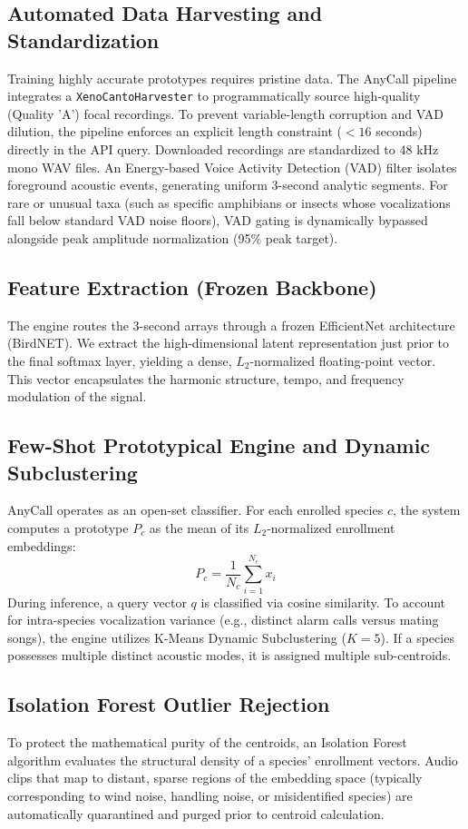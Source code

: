 \documentclass[11pt]{article}
\begin{document}
\subsection{Automated Data Harvesting and Standardization}
Training highly accurate prototypes requires pristine data. The AnyCall pipeline integrates a \texttt{XenoCantoHarvester} to programmatically source high-quality (Quality 'A') focal recordings. To prevent variable-length corruption and VAD dilution, the pipeline enforces an explicit length constraint ($<16$ seconds) directly in the API query. 
Downloaded recordings are standardized to $48\text{ kHz}$ mono WAV files. An Energy-based Voice Activity Detection (VAD) filter isolates foreground acoustic events, generating uniform 3-second analytic segments. For rare or unusual taxa (such as specific amphibians or insects whose vocalizations fall below standard VAD noise floors), VAD gating is dynamically bypassed alongside peak amplitude normalization (95\% peak target).

\subsection{Feature Extraction (Frozen Backbone)}
The engine routes the 3-second arrays through a frozen EfficientNet architecture (BirdNET). We extract the high-dimensional latent representation just prior to the final softmax layer, yielding a dense, $L_2$-normalized floating-point vector. This vector encapsulates the harmonic structure, tempo, and frequency modulation of the signal.

\subsection{Few-Shot Prototypical Engine and Dynamic Subclustering}
AnyCall operates as an open-set classifier. For each enrolled species $c$, the system computes a prototype $P_c$ as the mean of its $L_2$-normalized enrollment embeddings:
\begin{equation}
P_c = \frac{1}{N_c} \sum_{i=1}^{N_c} x_i
\end{equation}
During inference, a query vector $q$ is classified via cosine similarity. To account for intra-species vocalization variance (e.g., distinct alarm calls versus mating songs), the engine utilizes K-Means Dynamic Subclustering ($K=5$). If a species possesses multiple distinct acoustic modes, it is assigned multiple sub-centroids. 

\subsection{Isolation Forest Outlier Rejection}
To protect the mathematical purity of the centroids, an Isolation Forest algorithm evaluates the structural density of a species' enrollment vectors. Audio clips that map to distant, sparse regions of the embedding space (typically corresponding to wind noise, handling noise, or misidentified species) are automatically quarantined and purged prior to centroid calculation.
\end{document}
